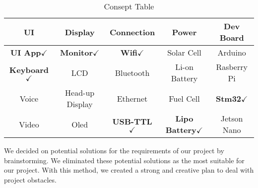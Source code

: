 \documentclass[12pt]{article}
\begin{document}
	\begin{table}[H]
	\centering
	\begin{tabular}{|c|c|c|c|c|}
		\hline
		UI & Display & Connection & Power & Dev Board \\
		\hline
		\textbf{UI App}$\checkmark$
		 &\textbf{Monitor}$\checkmark$
		   & \textbf{Wifi}$\checkmark$
		   & Solar Cell & Arduino\\
		\hline
		\textbf{Keyboard}$\checkmark$
		 & LCD & Bluetooth & Li-on Battery & Rasberry Pi \\
		\hline
		Voice & Head-up Display & Ethernet & Fuel Cell &\textbf{Stm32}$\checkmark$
		 \\
		\hline
		Video & Oled &\textbf{USB-TTL}$\checkmark$  & \textbf{Lipo Battery}$\checkmark$
		 & Jetson Nano \\
		\hline
	\end{tabular}
	\caption{Consept Table}
\end{table}
We decided on potential solutions for the requirements of our project by brainstorming. We eliminated these potential solutions as the most suitable for our project. With this method, we created a strong and creative plan to deal with project obstacles. 


\vskip 10cm
\end{document}
